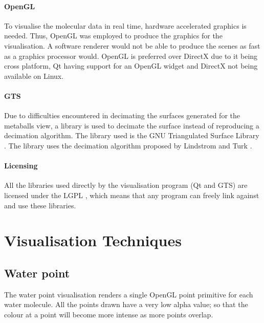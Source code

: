 
\paragraph{OpenGL}

To visualise the molecular data in real time, hardware accelerated graphics is
needed. Thus, OpenGL \citep{OpenGL} was employed to produce the graphics for
the visualisation. A software renderer would not be able to produce the scenes
as fast as a graphics processor would. OpenGL is preferred over DirectX due to
it being cross platform, Qt having support for an OpenGL widget and DirectX not
being available on Linux.


\paragraph{GTS}

Due to difficulties encountered in decimating the surfaces generated for the
metaballs view, a library is used to decimate the surface instead of
reproducing a decimation algorithm. The library used is the GNU Triangulated
Surface Library \citep{GTS}. The library uses the decimation algorithm proposed
by Lindstrom and Turk \citep{lindstrom98}.


\paragraph{Licensing}

All the libraries used directly by the visualisation program (Qt and GTS) are
licensed under the LGPL \citep{LGPL}, which means that any program can freely
link against and use these libraries.



\section{Visualisation Techniques}
\label{sec:implementation_techniques}

\subsection{Water point}
\label{sub:implementation_point}

The water point visualisation renders a single OpenGL point primitive for each
water molecule. All the points drawn have a very low alpha value; so that the
colour at a point will become more intense as more points overlap.

